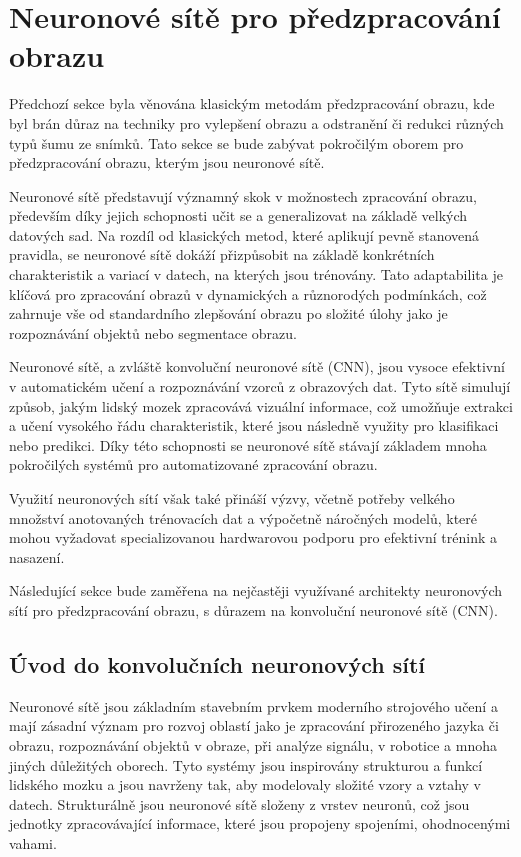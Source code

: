 \documentclass[male,czech,api_ing]{thesis}
\begin{document}
\section{Neuronové sítě pro předzpracování obrazu}
Předchozí sekce byla věnována klasickým metodám předzpracování obrazu, kde byl brán důraz na techniky pro vylepšení obrazu a odstranění či redukci různých typů šumu ze snímků. Tato sekce se bude zabývat pokročilým oborem pro předzpracování obrazu, kterým jsou neuronové sítě.

Neuronové sítě představují významný skok v možnostech zpracování obrazu, především díky jejich schopnosti učit se a generalizovat na základě velkých datových sad. Na rozdíl od klasických metod, které aplikují pevně stanovená pravidla, se neuronové sítě dokáží přizpůsobit na základě konkrétních charakteristik a variací v datech, na kterých jsou trénovány. Tato adaptabilita je klíčová pro zpracování obrazů v dynamických a různorodých podmínkách, což zahrnuje vše od standardního zlepšování obrazu po složité úlohy jako je rozpoznávání objektů nebo segmentace obrazu.

Neuronové sítě, a zvláště konvoluční neuronové sítě (CNN), jsou vysoce efektivní v automatickém učení a rozpoznávání vzorců z obrazových dat. Tyto sítě simulují způsob, jakým lidský mozek zpracovává vizuální informace, což umožňuje extrakci a učení vysokého řádu charakteristik, které jsou následně využity pro klasifikaci nebo predikci. Díky této schopnosti se neuronové sítě stávají základem mnoha pokročilých systémů pro automatizované zpracování obrazu.

Využití neuronových sítí však také přináší výzvy, včetně potřeby velkého množství anotovaných trénovacích dat a výpočetně náročných modelů, které mohou vyžadovat specializovanou hardwarovou podporu pro efektivní trénink a nasazení. 

Následující sekce bude zaměřena na nejčastěji využívané architekty neuronových sítí pro předzpracování obrazu, s důrazem na konvoluční neuronové sítě (CNN). \cite{CNNConcepts}

\subsection{Úvod do konvolučních neuronových sítí}
Neuronové sítě jsou základním stavebním prvkem moderního strojového učení a mají zásadní význam pro rozvoj oblastí jako je zpracování přirozeného jazyka či obrazu, rozpoznávání objektů v obraze, při analýze signálu, v robotice a mnoha jiných důležitých oborech. Tyto systémy jsou inspirovány strukturou a funkcí lidského mozku a jsou navrženy tak, aby modelovaly složité vzory a vztahy v datech. Strukturálně jsou neuronové sítě složeny z vrstev neuronů, což jsou jednotky zpracovávající informace, které jsou propojeny spojeními, ohodnocenými vahami.
\end{document}
